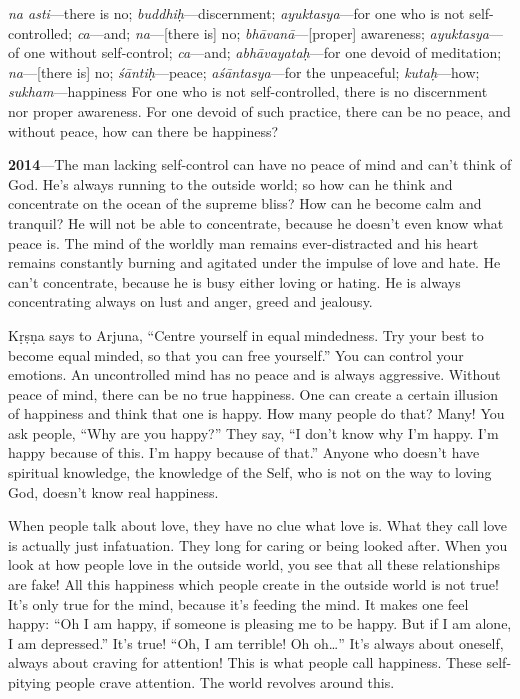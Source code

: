 {%
  \textit{na asti}---there is no; 
  \textit{buddhiḥ}---discernment; 
  \textit{ayuktasya}---for one who is not self-controlled; 
  \textit{ca}---and; 
  \textit{na}---[there is] no; 
  \textit{bhāvanā}---[proper] awareness; 
  \textit{ayuktasya}---of one without self-control; 
  \textit{ca}---and; 
  \textit{abhāvayataḥ}---for one devoid of meditation; 
  \textit{na}---[there is] no; 
  \textit{śāntiḥ}---peace; 
  \textit{aśāntasya}---for the unpeaceful; 
  \textit{kutaḥ}---how; 
  \textit{sukham}---happiness
}
{%
  For one who is not self-controlled, there is no discernment nor proper awareness. For one devoid of such practice, there can be no peace, and without peace, how can there be happiness?
}

\textbf{2014}---The man lacking self-control can have no peace of mind and can’t think of God. He’s always running to the outside world; so how can he think and concentrate on the ocean of the supreme bliss? How can he become calm and tranquil? He will not be able to concentrate, because he doesn’t even know what peace is. The mind of the worldly man remains ever-distracted and his heart remains constantly burning and agitated under the impulse of love and hate. He can’t concentrate, because he is busy either loving or hating. He is always concentrating always on lust and anger, greed and jealousy.

Kṛṣṇa says to Arjuna, “Centre yourself in equalmindedness. Try your best to become equalminded, so that you can free yourself.” You can control your emotions. An uncontrolled mind has no peace and is always aggressive. Without peace of mind, there can be no true happiness. One can create a certain illusion of happiness and think that one is happy. How many people do that? Many! You ask people, “Why are you happy?” They say, “I don’t know why I’m happy. I’m happy because of this. I’m happy because of that.” Anyone who doesn’t have spiritual knowledge, the knowledge of the Self, who is not on the way to loving God, doesn’t know real happiness.

When people talk about love, they have no clue what love is. What they call love is actually just infatuation. They long for caring or being looked after. When you look at how people love in the outside world, you see that all these relationships are fake! All this happiness which people create in the outside world is not true! It’s only true for the mind, because it’s feeding the mind. It makes one feel happy: “Oh I am happy, if someone is pleasing me to be happy. But if I am alone, I am depressed.” It’s true! “Oh, I am terrible! Oh oh…” It’s always about oneself, always about craving for attention! This is what people call happiness. These self-pitying people crave attention. The world revolves around this.


